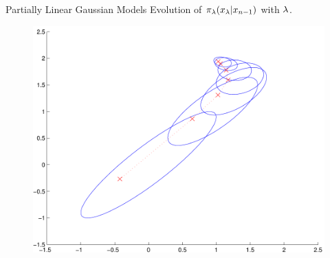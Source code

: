 \documentclass{beamer}
\begin{document}
\begin{frame}{Partially Linear Gaussian Models}
Evolution of $\pi_{\lambda}(x_{\lambda}|x_{n-1})$ with $\lambda$.
\begin{figure}
\centering
\includegraphics[width=0.5\columnwidth]{plg_oid_evolution.pdf}
\end{figure}
\end{frame}
\end{document}
